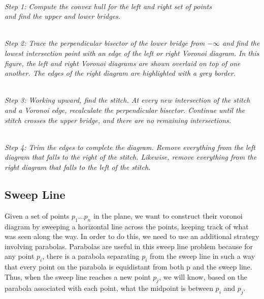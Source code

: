 \documentclass[10pt]{article}
\begin{document}
\begin{center}
 \\
{\em
Step 1: Compute the convex hull for the left and right set of points\\
and find the upper and lower bridges.}
\vfill

 \\
{\em Step 2: Trace the perpendicular bisector of the lower bridge from
$ - \infty$ and find the lowest intersection point with an edge of the
left or right Voronoi diagram.  In this figure, the left and right
Voronoi diagrams are shown overlaid on top of one another.  The edges
of the right diagram are highlighted with a grey border.  }

 \\ {\em
Step 3: Working upward, find the stitch.  At every new intersection of
the stitch and a Voronoi edge, recalculate the perpendicular
bisector.  Continue until the stitch crosses the upper bridge, and
there are no remaining intersections. }
\vfill

 \\
{\em Step 4: Trim the edges to complete the diagram.  Remove
everything from the left diagram that falls to the right of the
stitch.  Likewise, remove everything from the right diagram that falls
to the left of the stitch. }
\end{center}

\subsection{Sweep Line}

Given a set of points $p_1...p_n$ in the plane, we want to construct their 
voronoi diagram by sweeping a horizontal line across the points, keeping track 
of what was seen along the way.  In order to do this, we need to use an 
additional strategy involving parabolas.  Parabolas are useful in this 
sweep line problem because for any point $p_i$, there is a parabola separating 
$p_i$ from the sweep line in such a way that every point on the parabola is 
equidistant from both p and the sweep line.  Thus, when the sweep line reaches
a new point $p_j$, we will know, based on the parabola associated with each point,
what the midpoint is between $p_i$ and $p_j$.
\end{document}
